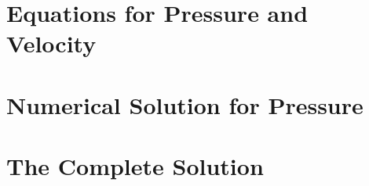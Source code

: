 \section{Equations for Pressure and Velocity}

\section{Numerical Solution for Pressure}

\section{The Complete Solution}